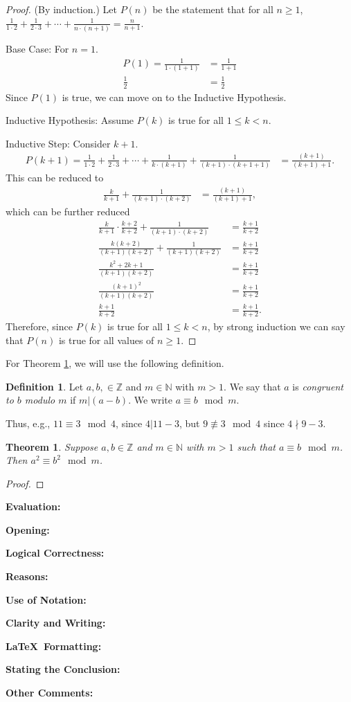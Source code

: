 \documentclass[11pt,titlepage]{article}		%
\def\rubric{\textbf{Evaluation:} \makebox[0.75in]{\hrulefill}

\vspace{.3in}

\textbf{Opening:} \makebox[0.75in]{\hrulefill}

\vspace{.3in}

\textbf{Logical Correctness:} \makebox[0.75in]{\hrulefill}

\vspace{.3in}

\textbf{Reasons:} \makebox[0.75in]{\hrulefill}

\vspace{.3in}

\textbf{Use of Notation:} \makebox[0.75in]{\hrulefill}

\vspace{.3in}

\textbf{Clarity and Writing:} \makebox[0.75in]{\hrulefill}

\vspace{.3in}

\textbf{\LaTeX\ Formatting:} \makebox[0.75in]{\hrulefill}

\vspace{.3in}

\textbf{Stating the Conclusion:} \makebox[0.75in]{\hrulefill}

\vspace{.3in}

\textbf{Other Comments:}

\vspace{1in}

}
\def\Z{{\mathbb Z}}
\def\N{{\mathbb N}}
\theoremstyle{theorem}
\newtheorem{theorem}{Theorem}
\begin{document}
\begin{proof}
(By induction.)
Let $P(n)$ be the statement that for all $n \ge 1$, $\frac{1}{1\cdot 2} + \frac{1}{2\cdot 3} + \cdots + \frac{1}{n\cdot(n+1)} = \frac{n}{n+1}$. 

Base Case: For $n = 1$.
\begin{align*}
P(1) = \frac{1}{1 \cdot (1+1)} &= \frac{1}{1+1}\\
\frac{1}{2} &= \frac{1}{2}
\end{align*}
Since $P(1)$ is true, we can move on to the Inductive Hypothesis.

Inductive Hypothesis: Assume $P(k)$ is true for all $1 \le k < n$.

Inductive Step: Consider $k+1$.
\begin{align*}
P(k+1) = \frac{1}{1\cdot 2} + \frac{1}{2\cdot 3} + \cdots + \frac{1}{k\cdot(k+1)} + \frac{1}{(k+1) \cdot (k+1+1)} &= \frac{(k+1)}{(k+1)+1}.
\end{align*}
This can be reduced to
\begin{align*}
\frac{k}{k+1} + \frac{1}{(k+1) \cdot (k+2)}&= \frac{(k+1)}{(k+1)+1},
\end{align*}
which can be further reduced
\begin{align*}
\frac{k}{k+1}\cdot \frac{k+2}{k+2} + \frac{1}{(k+1) \cdot (k+2)} &= \frac{k+1}{k+2}\\
\frac{k(k+2)}{(k+1)(k+2)} + \frac{1}{(k+1)(k+2)} &= \frac{k+1}{k+2}\\
\frac{k^2+2k+1}{(k+1)(k+2)} &= \frac{k+1}{k+2}\\
\frac{(k+1)^2}{(k+1)(k+2)} &= \frac{k+1}{k+2}\\
\frac{k+1}{k+2} &= \frac{k+1}{k+2}.
\end{align*}
Therefore, since $P(k)$ is true for all $1 \le k < n$, by strong induction we can say that $P(n)$ is true for all values of $n \ge 1$.
\end{proof}
\clearpage

For Theorem \ref{thm:modular-squares}, we will use the following definition.

\theoremstyle{definition}
\newtheorem{definition}{Definition}
\begin{definition}
    Let $a,b,\in\Z$ and $m\in \N$ with $m > 1$.
    We say that $a$ is \emph{congruent to $b$ modulo $m$} if $m|(a-b)$.
    We write $a \equiv b\mod m$.
\end{definition}

Thus, e.g., $11\equiv 3\mod 4$, since $4|11-3$, but $9\not\equiv 3\mod 4$ since $4\nmid 9-3$.

\begin{theorem}\label{thm:modular-squares}
    Suppose $a,b\in \Z$ and $m\in \N$ with $m > 1$ such that $a\equiv b\mod m$.
    Then $a^2 \equiv b^2\mod m$.
\end{theorem}

\begin{proof}

\end{proof}

\clearpage

\rubric
\end{document}
